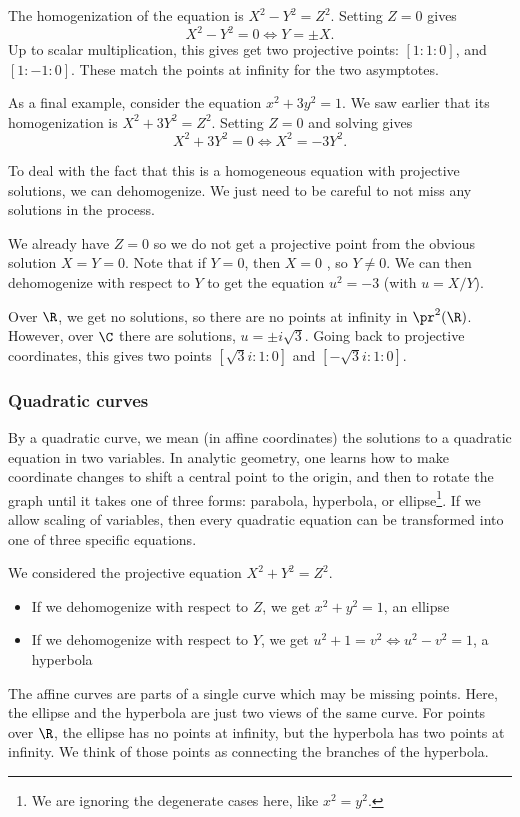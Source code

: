 \documentclass[12pt]{amsart}
\theoremstyle{plain}
\theoremstyle{definition}
\theoremstyle{remark}
\begin{document}
The homogenization of the equation is $X^2-Y^2=Z^2$.
Setting $Z=0$ gives 
\[ X^2-Y^2=0 \iff Y=\pm X. \]
Up to scalar multiplication, this gives get two projective points:
$[1:1:0]$, and $[1:-1:0]$.  These match the points at infinity for the
two asymptotes.

As a final example, consider the equation
$x^2+3y^2=1$.  We saw earlier that its homogenization is
$X^2+3Y^2=Z^2$.  Setting $Z=0$ and solving gives
\[  X^2+3Y^2=0 \iff X^2=-3Y^2. \]

To deal with the fact that this is a homogeneous equation with
projective solutions, we can dehomogenize.  We just need to be careful
to not miss any solutions in the process.

We already have $Z=0$ so we do not get a projective point from the
obvious solution $X=Y=0$.  Note that if $Y=0$, then $X=0$ \con, so
$Y\neq 0$.  We can then dehomogenize with respect to $Y$ to get the
equation $u^2=-3$ (with $u=X/Y$).

Over $\R$, we get no solutions, so there are no points at infinity in
$\pr^2(\R)$.  However, over $\C$ there are solutions, $u=\pm i\sqrt
3$.  Going back to projective coordinates, this gives two points
$[\sqrt{3}i:1:0]$ and $[-\sqrt{3}i:1:0]$. 

\subsubsection{Quadratic curves}

By a quadratic curve, we mean (in affine coordinates) the solutions to
a quadratic equation in two variables.  In analytic geometry, one
learns how to make coordinate changes to shift a central point to the
origin, and then to rotate the graph until it takes one of three
forms: parabola, hyperbola, or ellipse\footnote{We are ignoring the
  degenerate cases here, like $x^2=y^2$.}.  If we allow scaling of
variables, then every quadratic equation can be transformed into one
of three specific equations.

We considered the projective equation $X^2+Y^2=Z^2$.
\begin{itemize}
\item If we dehomogenize with respect to $Z$, we get $x^2+y^2=1$, an ellipse
\item If we dehomogenize with respect to $Y$, we get $u^2+1=v^2\iff u^2-v^2=1$, a hyperbola
\end{itemize}
The affine curves are parts of a single curve which may be missing
points.  Here, the ellipse and the hyperbola are just two views of the
same curve.  For points over $\R$, the ellipse has no points at
infinity, but the hyperbola has two points at infinity.  We think of
those points as connecting the branches of the hyperbola.
\end{document}
